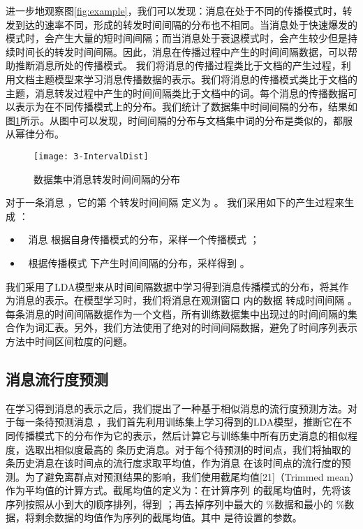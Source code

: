 进一步地观察图\ref{fig:example}，我们可以发现：消息在处于不同的传播模式时，转发到达的速率不同，形成的转发时间间隔的分布也不相同。当消息处于快速爆发的模式时，会产生大量的短时间间隔；而当消息处于衰退模式时，会产生较少但是持续时间长的转发时间间隔。因此，消息在传播过程中产生的时间间隔数据，可以帮助推断消息所处的传播模式。
我们将消息的传播过程类比于文档的产生过程，利用文档主题模型来学习消息传播数据的表示。我们将消息的传播模式类比于文档的主题，消息转发过程中产生的时间间隔类比于文档中的词。每个消息的传播数据可以表示为在不同传播模式上的分布。我们统计了数据集中时间间隔的分布，结果如图\ref{fig:intervalDist}所示。从图中可以发现，时间间隔的分布与文档集中词的分布是类似的，都服从幂律分布。
\begin{figure}[!htbp]
  \centering
  \texttt{[image: 3-IntervalDist]}
  \caption{数据集中消息转发时间间隔的分布}
  \label{fig:intervalDist}
\end{figure}

对于一条消息 ，它的第 个转发时间间隔 定义为 。 我们采用如下的产生过程来生成 ：
\begin{itemize}
\item	消息 根据自身传播模式的分布，采样一个传播模式 ；
\item	根据传播模式 下产生时间间隔的分布，采样得到 。
\end{itemize}

我们采用了LDA模型来从时间间隔数据中学习得到消息传播模式的分布，将其作为消息的表示。在模型学习时，我们将消息在观测窗口 内的数据 转成时间间隔 。每条消息的时间间隔数据作为一个文档，所有训练数据集中出现过的时间间隔的集合作为词汇表。另外，我们方法使用了绝对的时间间隔数据，避免了时间序列表示方法中时间区间粒度的问题。

\subsection{消息流行度预测}
在学习得到消息的表示之后，我们提出了一种基于相似消息的流行度预测方法。对于每一条待预测消息 ，我们首先利用训练集上学习得到的LDA模型，推断它在不同传播模式下的分布作为它的表示，然后计算它与训练集中所有历史消息的相似程度，选取出相似度最高的 条历史消息。对于每个待预测的时间点，我们将抽取的 条历史消息在该时间点的流行度求取平均值，作为消息 在该时间点的流行度的预测。为了避免离群点对预测结果的影响，我们使用截尾均值[21]（Trimmed mean）作为平均值的计算方式。截尾均值的定义为：在计算序列 的截尾均值时，先将该序列按照从小到大的顺序排列，得到 ；再去掉序列中最大的 \%数据和最小的 \%数据，将剩余数据的均值作为序列的截尾均值。其中 是待设置的参数。

